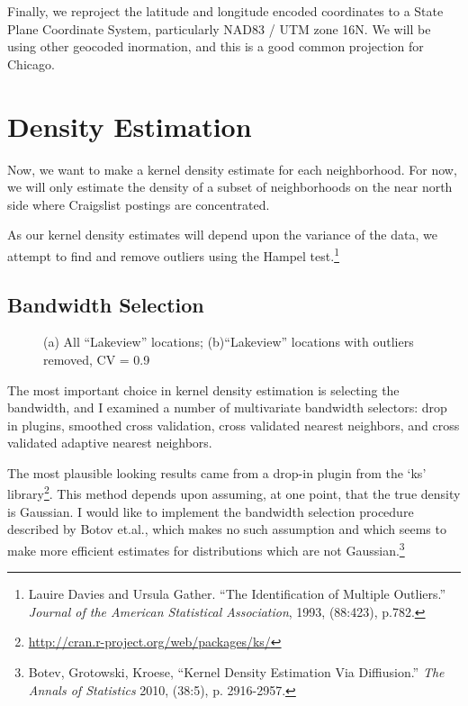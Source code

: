 \documentclass{article}
\begin{document}
Finally, we reproject the latitude and longitude encoded coordinates to a
State Plane Coordinate System, particularly NAD83 / UTM zone 16N. We
will be using other geocoded inormation, and this is a good common
projection for Chicago.




 



\section{Density Estimation}
Now, we want to make a kernel density estimate for each
neighborhood. For now, we will only estimate the density of a subset
of neighborhoods on the near north side where Craigslist postings
are concentrated.

As our kernel density estimates will depend upon the variance of the
data, we attempt to find and remove outliers using the Hampel
test.\footnote{Lauire Davies and Ursula Gather. ``The Identification
  of Multiple Outliers.'' \emph{Journal of the American Statistical
    Association}, 1993, (88:423), p.782.}


\subsection{Bandwidth Selection}




\begin{figure}[h!]
  \centering
  \subfigure[]{

{\tikzexternaldisable

}
}
\subfigure[]{

{\tikzexternaldisable

}
}
\caption{(a) All ``Lakeview'' locations; (b)``Lakeview'' locations with outliers removed, CV = 0.9}
\end{figure}

The most important choice in kernel density estimation is selecting
the bandwidth, and I examined a number of multivariate bandwidth
selectors: drop in plugins, smoothed cross validation, cross validated
nearest neighbors, and cross validated adaptive nearest neighbors.

The most plausible looking results came from a drop-in plugin from the
`ks'
library\footnote{\url{http://cran.r-project.org/web/packages/ks/}}. This
method depends upon assuming, at one point, that the true density is
Gaussian. I would like to implement the bandwidth selection procedure
described by Botov et.al., which makes no such assumption and which
seems to make more efficient estimates for distributions which are not
Gaussian.\footnote{Botev, Grotowski, Kroese, ``Kernel Density
  Estimation Via Diffiusion.''  \emph{The Annals of Statistics} 2010,
  (38:5), p. 2916-2957.}
\end{document}
